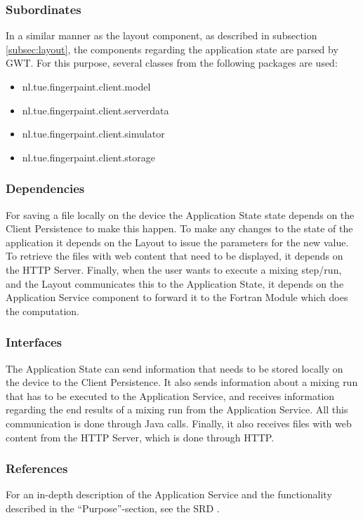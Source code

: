 \subsubsection*{Subordinates}
In a similar manner as the layout component, as described in subsection \ref{subsec:layout}, the components regarding the application state are parsed by GWT. 
For this purpose, several classes from the following packages are used:
\begin{itemize}
	\item nl.tue.fingerpaint.client.model
	\item nl.tue.fingerpaint.client.serverdata
	\item nl.tue.fingerpaint.client.simulator
	\item nl.tue.fingerpaint.client.storage
\end{itemize}

\subsubsection*{Dependencies}
For saving a file locally on the device the Application State state depends on the Client Persistence to make this happen. To make any changes to the state of the application it depends on the Layout to issue the parameters for the new value. To retrieve the files with web content that need to be displayed, it depends on the HTTP Server. Finally, when the user wants to execute a mixing step/run, and the Layout communicates this to the Application State, it depends on the Application Service component to forward it to the Fortran Module which does the computation.


\subsubsection*{Interfaces}
The Application State can send information that needs to be stored locally on the device to the Client Persistence. It also sends information about a mixing run that has to be executed to the Application Service, and receives information regarding the end results of a mixing run from the Application Service. All this communication is done through Java calls. Finally, it also receives files with web content from the HTTP Server, which is done through HTTP.


\subsubsection*{References}
For an in-depth description of the Application Service and the functionality described in the ``Purpose''-section, see the SRD \cite{srd}.

